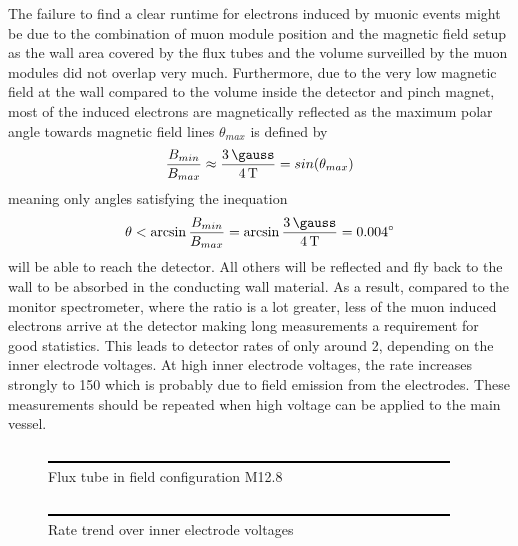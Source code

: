   
  The failure to find a clear runtime for electrons induced by muonic events might be due to the combination of muon module position and the magnetic field setup as the wall area covered by the flux tubes and the volume surveilled by the muon modules did not overlap very much. Furthermore, due to the very low magnetic field at the wall compared to the volume inside the detector and pinch magnet, most of the induced electrons are magnetically reflected as the maximum polar angle towards magnetic field lines $\theta_{max}$ is defined by
  \begin{equation}
  	\frac{B_{min}}{B_{max}} \approx \frac{\SI{3}{\gauss}}{\SI{4}{\tesla}} = sin(\theta_{max})
  \end{equation}
  meaning only angles satisfying the inequation
  \begin{equation}
  	\theta < \arcsin{\frac{B_{min}}{B_{max}}} = \arcsin{\frac{\SI{3}{\gauss}}{\SI{4}{\tesla}}} = \SI{0.004}{\degree}
  \end{equation}
  will be able to reach the detector. All others will be reflected and fly back to the wall to be absorbed in the conducting wall material. 
  As a result, compared to the monitor spectrometer, where the ratio is a lot greater, less of the muon induced electrons arrive at the detector making long measurements a requirement for good statistics. This leads to detector rates of only around \SI{2}{\cps}, depending on the inner electrode voltages. At high inner electrode voltages, the rate increases strongly to \SI{150}{\cps} which is probably due to field emission from the electrodes. 
  These measurements should be repeated when high voltage can be applied to the main vessel.

  
  \begin{figure}
	\caption{Flux tube in field configuration M12.8}
  	\includegraphics[width = 0.9 \textwidth]{graphics/dummy.eps}
  \end{figure}
  
  \begin{figure}
  	\caption{Rate trend over inner electrode voltages}
  	\includegraphics[width = 0.9 \textwidth]{graphics/dummy.eps}
  \end{figure}

